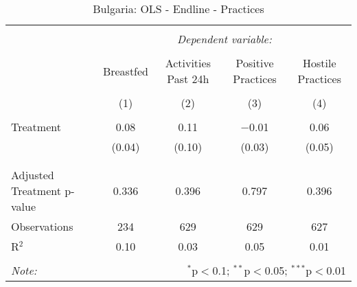 
\begin{table}[!htbp] \centering 
  \caption{Bulgaria: OLS - Endline - Practices} 
  \label{tbl:Bulgaria: OLS - Endline - Practices} 
\begin{tabular}{@{\extracolsep{5pt}}lcccc} 
\\[-1.8ex]\hline 
\hline \\[-1.8ex] 
 & \multicolumn{4}{c}{\textit{Dependent variable:}} \\ 
\cline{2-5} 
\\[-1.8ex] & Breastfed & Activities Past 24h & Positive Practices & Hostile Practices \\ 
\\[-1.8ex] & (1) & (2) & (3) & (4)\\ 
\hline \\[-1.8ex] 
 Treatment & 0.08 & 0.11 & $-$0.01 & 0.06 \\ 
  & (0.04) & (0.10) & (0.03) & (0.05) \\ 
  & & & & \\ 
\hline \\[-1.8ex] 
Adjusted Treatment p-value & 0.336 & 0.396 & 0.797 & 0.396 \\ 
Observations & 234 & 629 & 629 & 627 \\ 
R$^{2}$ & 0.10 & 0.03 & 0.05 & 0.01 \\ 
\hline 
\hline \\[-1.8ex] 
\textit{Note:}  & \multicolumn{4}{r}{$^{*}$p$<$0.1; $^{**}$p$<$0.05; $^{***}$p$<$0.01} \\ 
\end{tabular} 
\end{table} 
